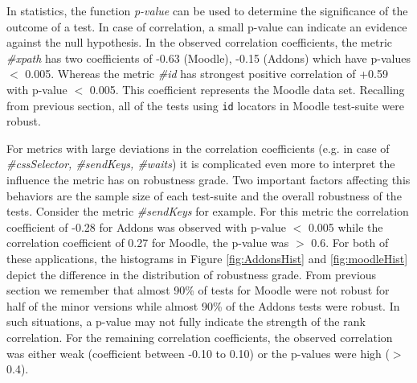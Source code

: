 
In statistics, the function \textit{p-value} can be used to determine the significance of the outcome of a test. In case of correlation, a small p-value can indicate an evidence against the null hypothesis.
In the observed correlation coefficients, the metric \textit{\#xpath} has two coefficients of -0.63 (Moodle), -0.15 (Addons) which have p-values $<$ 0.005. Whereas the metric \textit{\#id} has strongest positive correlation of +0.59 with p-value $<$ 0.005. This coefficient represents the Moodle data set. Recalling from previous section, all of the tests using \texttt{id} locators in Moodle test-suite were robust. 




For metrics with large deviations in the correlation coefficients (e.g. in case of \textit{\#cssSelector, \#sendKeys, \#waits}) it is complicated even more to interpret the influence the metric has on robustness grade. Two important factors affecting this behaviors are the sample size of each test-suite and the overall robustness of the tests. Consider the metric \textit{\#sendKeys} for example. For this metric the correlation coefficient of -0.28 for Addons was observed with p-value $<$ 0.005 while the correlation coefficient of 0.27 for Moodle, the p-value was $>$ 0.6. For both of these applications, the histograms in Figure \ref{fig:AddonsHist} and \ref{fig:moodleHist} depict the difference in the distribution of robustness grade. From previous section we remember that almost 90\% of tests for Moodle were not robust for half of the minor versions while almost 90\% of the Addons tests were robust. In such situations, a p-value may not fully indicate the strength of the rank correlation. For the remaining correlation coefficients, the observed correlation was either weak (coefficient between -0.10 to 0.10) or the p-values were high ($>$ 0.4). 

